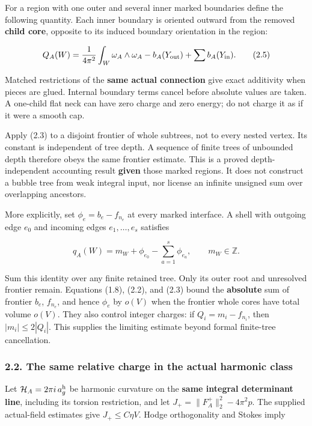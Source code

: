 \documentclass[
  10pt,
]{article}
\begin{document}
For a region with one outer and several inner marked boundaries define
the following quantity. Each inner boundary is oriented outward from the
removed \textbf{child core}, opposite to its induced boundary
orientation in the region:

\[
 Q_A(W)=\frac1{4\pi^2}\int_W\omega_A\wedge\omega_A
          -b_A(Y_{\rm out})+\sum b_A(Y_{\rm in}).
 \tag{2.5}
\]

Matched restrictions of the \textbf{same actual connection} give exact
additivity when pieces are glued. Internal boundary terms cancel before
absolute values are taken. A one-child flat neck can have zero charge
and zero energy; do not charge it as if it were a smooth cap.

Apply (2.3) to a disjoint frontier of whole subtrees, not to every
nested vertex. Its constant is independent of tree depth. A sequence of
finite trees of unbounded depth therefore obeys the same frontier
estimate. This is a proved depth-independent accounting result
\textbf{given} those marked regions. It does not construct a bubble tree
from weak integral input, nor license an infinite unsigned sum over
overlapping ancestors.

More explicitly, set \(\phi_e=b_e-f_{n_e}\) at every marked interface. A
shell with outgoing edge \(e_0\) and incoming edges \(e_1,\ldots,e_s\)
satisfies

\[
 q_A(W)=m_W+\phi_{e_0}-\sum_{a=1}^s\phi_{e_a},\qquad m_W\in\mathbb Z.
 \tag{2.6}
\]

Sum this identity over any finite retained tree. Only its outer root and
unresolved frontier remain. Equations (1.8), (2.2), and (2.3) bound the
\textbf{absolute} sum of frontier \(b_e\), \(f_{n_e}\), and hence
\(\phi_e\) by \(o(V)\) when the frontier whole cores have total volume
\(o(V)\). They also control integer charges: if \(Q_i=m_i-f_{n_i}\),
then \(|m_i|\le2|Q_i|\). This supplies the limiting estimate beyond
formal finite-tree cancellation.

\hypertarget{the-same-relative-charge-in-the-actual-harmonic-class}{%
\subsubsection{2.2. The same relative charge in the actual harmonic
class}\label{the-same-relative-charge-in-the-actual-harmonic-class}}

Let \(\mathcal H_A=2\pi i\,a_g^{\rm h}\) be harmonic curvature on the
\textbf{same integral determinant line}, including its torsion
restriction, and let \(J_+=\|F_A^+\|_2^2-4\pi^2p\). The supplied
actual-field estimates give \(J_+\le C\eta V\). Hodge orthogonality and
Stokes imply
\end{document}
